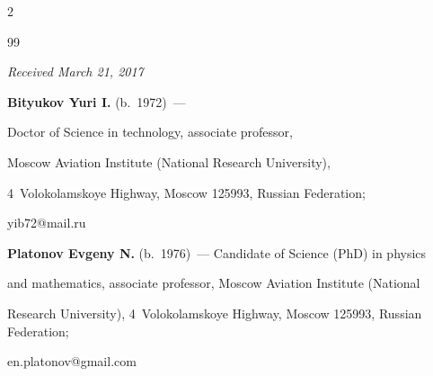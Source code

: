 \begin{multicols}{2}
{{\begin{thebibliography}{99}








\end{thebibliography}





 }


 }





\end{multicols}





\vspace*{-6pt}





\hfill{\small\textit{Received March 21, 2017}}










\Contr





\noindent


\textbf{Bityukov Yuri I.} (b.\ 1972)~--- 


Doctor of Science in technology, associate professor, 


Moscow Aviation Institute (National Research University), 


4~Volokolamskoye Highway, Moscow 125993, Russian Federation; 


\mbox{yib72@mail.ru}





\vspace*{3pt}





\noindent


\textbf{Platonov Evgeny N.} (b.\ 1976)~--- Candidate of Science (PhD) in physics 


and mathematics, associate professor, Moscow Aviation Institute (National 


Research University), 4~Volokolamskoye Highway, Moscow 125993, Russian Federation;


\mbox{en.platonov@gmail.com}


\label{end\stat}








\renewcommand{\bibname}{\protect\rm Литература} 


